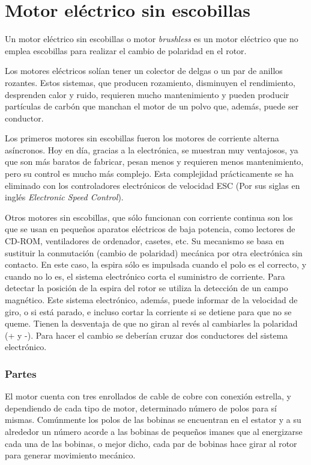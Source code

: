 \documentclass[../main]{subfiles}
\begin{document}
\chapter{Motor el\'ectrico{} sin escobillas}
Un motor el\'ectrico{} sin escobillas o motor \emph{brushless} es un motor el\'ectrico{} que no emplea escobillas para realizar el cambio de polaridad en el rotor.

Los motores el\'ectricos{} sol\'ian{} tener un colector de delgas o un par de anillos rozantes. Estos sistemas, que producen rozamiento, disminuyen el rendimiento, desprenden calor y ruido, requieren mucho mantenimiento y pueden producir part\'iculas{} de carb\'on{} que manchan el motor de un polvo que, adem\'as{}, puede ser conductor.


Los primeros motores sin escobillas fueron los motores de corriente alterna as\'incronos{}. Hoy en d\'ia{}, gracias a la electr\'onica{}, se muestran muy ventajosos, ya que son m\'as{} baratos de fabricar, pesan menos y requieren menos mantenimiento, pero su control es mucho m\'as{} complejo. Esta complejidad pr\'acticamente{} se ha eliminado con los controladores electr\'onicos{} de velocidad ESC (Por sus siglas en ingl\'es{} \emph{Electronic Speed Control}).

Otros motores sin escobillas, que s\'olo{} funcionan con corriente continua son los que se usan en peque\~nos{} aparatos el\'ectricos{} de baja potencia, como lectores de CD-ROM, ventiladores de ordenador, casetes, etc. Su mecanismo se basa en sustituir la conmutaci\'on{} (cambio de polaridad) mec\'anica{} por otra electr\'onica{} sin contacto. En este caso, la espira s\'olo{} es impulsada cuando el polo es el correcto, y cuando no lo es, el sistema electr\'onico{} corta el suministro de corriente. Para detectar la posici\'on{} de la espira del rotor se utiliza la detecci\'on{} de un campo magn\'etico{}. Este sistema electr\'onico{}, adem\'as{}, puede informar de la velocidad de giro, o si est\'a{} parado, e incluso cortar la corriente si se detiene para que no se queme. Tienen la desventaja de que no giran al rev\'es{} al cambiarles la polaridad (+ y -). Para hacer el cambio se deber\'ian{} cruzar dos conductores del sistema electr\'onico{}.

\subsection{Partes}
El motor cuenta con tres enrollados de cable de cobre con conexi\'on{} estrella, y dependiendo de cada tipo de motor, determinado n\'umero{} de polos para s\'i{} mismas. Com\'unmente{} los polos de las bobinas se encuentran en el estator y a su alrededor un n\'umero{} acorde a las bobinas de peque\~nos{} imanes que al energizarse cada una de las bobinas, o mejor dicho, cada par de bobinas hace girar al rotor para generar movimiento mec\'anico{}.
\end{document}
